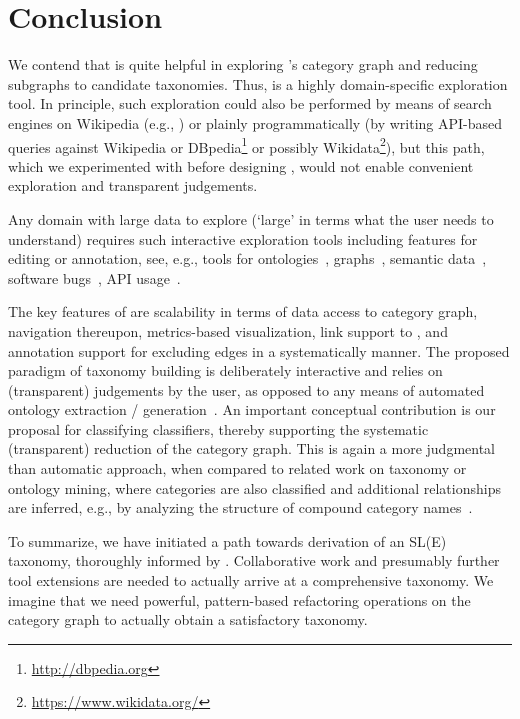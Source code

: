 
\section{Conclusion}
\label{S:concl}

We contend that \WikiTax{} is quite helpful in exploring \Wikipedia's category graph and reducing subgraphs to candidate taxonomies. Thus, \WikiTax{} is a highly domain-specific exploration tool. In principle, such exploration could also be performed by means of search engines on Wikipedia (e.g., \cite{MilneW11a}) or plainly programmatically (by writing API-based queries against Wikipedia or DBpedia\footnote{\url{http://dbpedia.org}} or possibly Wikidata\footnote{\url{https://www.wikidata.org/}}), but this path, which we experimented with before designing \WikiTax, would not enable convenient exploration and transparent judgements.

Any domain with large data to explore (`large' in terms what the user needs to understand) requires such interactive exploration tools including features for editing or annotation, see, e.g., tools for ontologies~\cite{BaskayaKJ10}, graphs~\cite{HaunNKTB10}, semantic data~\cite{DumasBHS12}, software bugs~\cite{HoraADBCVM12}, API usage~\cite{RooverLP13}.

The key features of \WikiTax{} are scalability in terms of data access to \Wikipedia{} category graph, navigation thereupon, metrics-based visualization, link support to \Wikipedia, and annotation support for excluding edges in a systematically manner. The proposed paradigm of taxonomy building is deliberately interactive and relies on (transparent) judgements by the user, as opposed to any means of automated ontology extraction / generation~\cite{WuW08,SuchanekKW08}. An important conceptual contribution is our proposal for classifying classifiers, thereby supporting the systematic (transparent) reduction of the category graph. This is again a more judgmental than automatic approach, when compared to related work on taxonomy or ontology mining, where categories are also classified and additional relationships are inferred, e.g., by analyzing the structure of compound category names~\cite{NastaseS08}.

To summarize, we have initiated a path towards derivation of an SL(E) taxonomy, thoroughly informed by \Wikipedia. Collaborative work and presumably further tool extensions are needed to actually arrive at a comprehensive taxonomy. We imagine that we need powerful, pattern-based refactoring operations on the category graph to actually obtain a satisfactory taxonomy.

